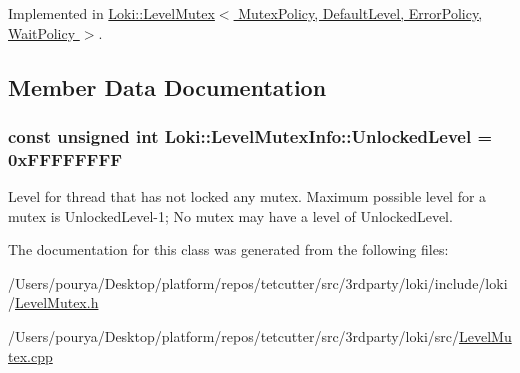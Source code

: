 Implemented in \hyperlink{classLoki_1_1LevelMutex_a553a379257af57ceaef9ed48b0dc8b70}{Loki\+::\+Level\+Mutex$<$ Mutex\+Policy, Default\+Level, Error\+Policy, Wait\+Policy $>$}.



\subsection{Member Data Documentation}
\hypertarget{classLoki_1_1LevelMutexInfo_a1f68bae408eb26856776cf02efed90bc}{}
\subsubsection[{Unlocked\+Level}]{\setlength{\rightskip}{0pt plus 5cm}const unsigned int Loki\+::\+Level\+Mutex\+Info\+::\+Unlocked\+Level = 0x\+F\+F\+F\+F\+F\+F\+F\+F\hspace{0.3cm}{\ttfamily [static]}}\label{classLoki_1_1LevelMutexInfo_a1f68bae408eb26856776cf02efed90bc}
Level for thread that has not locked any mutex. Maximum possible level for a mutex is Unlocked\+Level-\/1; No mutex may have a level of Unlocked\+Level. 

The documentation for this class was generated from the following files\+:\begin{DoxyCompactItemize}
\item 
/\+Users/pourya/\+Desktop/platform/repos/tetcutter/src/3rdparty/loki/include/loki/\hyperlink{LevelMutex_8h}{Level\+Mutex.\+h}\item 
/\+Users/pourya/\+Desktop/platform/repos/tetcutter/src/3rdparty/loki/src/\hyperlink{LevelMutex_8cpp}{Level\+Mutex.\+cpp}\end{DoxyCompactItemize}
